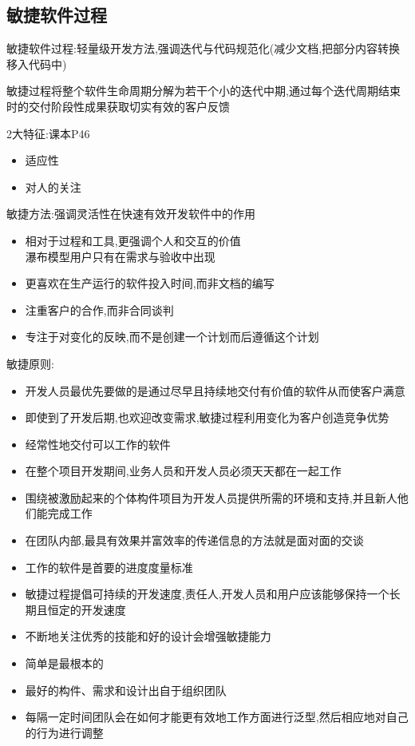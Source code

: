 \documentclass[UTF8,a4paper]{ctexart}
\begin{document}
\subsection{敏捷软件过程}
敏捷软件过程:轻量级开发方法,强调迭代与代码规范化(减少文档,把部分内容转换移入代码中)

敏捷过程将整个软件生命周期分解为若干个小的迭代中期,通过每个迭代周期结束时的交付阶段性成果获取切实有效的客户反馈

2大特征:课本P46
\begin{itemize}
  \item 适应性
  \item 对人的关注
\end{itemize}

敏捷方法:强调灵活性在快速有效开发软件中的作用
\begin{itemize}
  \item 相对于过程和工具,更强调个人和交互的价值\\
  瀑布模型用户只有在需求与验收中出现
  \item 更喜欢在生产运行的软件投入时间,而非文档的编写
  \item 注重客户的合作,而非合同谈判
  \item 专注于对变化的反映,而不是创建一个计划而后遵循这个计划
\end{itemize}

敏捷原则:
\begin{itemize}
  \item 开发人员最优先要做的是通过尽早且持续地交付有价值的软件从而使客户满意
  \item 即使到了开发后期,也欢迎改变需求,敏捷过程利用变化为客户创造竞争优势
  \item 经常性地交付可以工作的软件
  \item 在整个项目开发期间,业务人员和开发人员必须天天都在一起工作
  \item 围绕被激励起来的个体构件项目为开发人员提供所需的环境和支持,并且新人他们能完成工作
  \item 在团队内部,最具有效果并富效率的传递信息的方法就是面对面的交谈
  \item 工作的软件是首要的进度度量标准
  \item 敏捷过程提倡可持续的开发速度,责任人,开发人员和用户应该能够保持一个长期且恒定的开发速度
  \item 不断地关注优秀的技能和好的设计会增强敏捷能力
  \item 简单是最根本的
  \item 最好的构件、需求和设计出自于组织团队
  \item 每隔一定时间团队会在如何才能更有效地工作方面进行泛型,然后相应地对自己的行为进行调整
\end{itemize}
\end{document}
